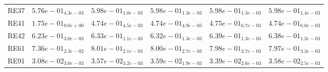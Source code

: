 \documentclass{article}
\begin{document}
\begin{table}
\begin{scriptsize}
\begin{tabular}{llllll}
RE37 & $  5.76e-01_{ 4.3e-03}$ & \cellcolor{gray25}$  5.98e-01_{ 1.0e-03}$ & $  5.98e-01_{ 1.3e-03}$ & \cellcolor{gray95}$  5.98e-01_{ 1.3e-03}$ & $  5.98e-01_{ 1.4e-03}$ \\
RE41 & $  1.75e-01_{ 0.0e+00}$ & $  4.74e-01_{ 4.5e-03}$ & $  4.74e-01_{ 4.9e-03}$ & \cellcolor{gray95}$  4.75e-01_{ 6.7e-03}$ & \cellcolor{gray25}$  4.74e-01_{ 6.0e-03}$ \\
RE42 & $  6.23e-01_{ 3.0e-03}$ & $  6.33e-01_{ 1.1e-03}$ & $  6.32e-01_{ 1.3e-03}$ & \cellcolor{gray95}$  6.39e-01_{ 1.3e-03}$ & \cellcolor{gray25}$  6.38e-01_{ 1.3e-03}$ \\
RE61 & $  7.36e-01_{ 2.3e-02}$ & \cellcolor{gray95}$  8.01e-01_{ 2.1e-03}$ & \cellcolor{gray25}$  8.00e-01_{ 2.7e-03}$ & $  7.98e-01_{ 3.7e-03}$ & $  7.97e-01_{ 3.3e-03}$ \\
RE91 & $  3.08e-02_{ 3.0e-03}$ & $  3.57e-02_{ 3.2e-03}$ & \cellcolor{gray95}$  3.59e-02_{ 1.9e-03}$ & $  3.39e-02_{ 2.6e-03}$ & \cellcolor{gray25}$  3.58e-02_{ 2.5e-03}$ \\
\hline
\end{tabular}
\end{scriptsize}
\end{table}
\end{document}
